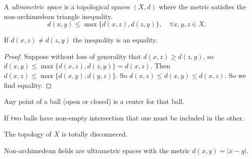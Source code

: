 \begin{definition}
	A \emph{ultrametric space} is a topological spaces $(X, d)$ where the metric satisfies the non-archimedean triangle inequality. 
	\[
		d(x, y) \le \max \{d(x, z) ,d(z, y)\}, \quad \forall x, y ,z \in X
	.\] 
\end{definition}
\begin{exercise}
	If $d(x,z) \ne d(z,y)$ the inequality is an equality. 
\end{exercise}
\begin{proof}
	Suppose without loss of generality that $d(x, z) \ge d(z,y)$, so $d(x, y) \le \max \{d(x, z), d(z,y)\} = d(x, z) $. 
	Then $d(x, z) \le \max \{d(x, y), d(y,z)\}$. So $d(x, z) \le d(x, y) \le d(x, z)$. So we find equality.
\end{proof}
\begin{corollary}
	Any point of a ball (open or closed) is a center for that ball. 
\end{corollary}
\begin{corollary}
	If two balls have non-empty intersection that one must be included in the other. 
\end{corollary}
\begin{corollary}
	The topology of $X$ is totally disconneced. 
\end{corollary}

Non-archimedean fields are ultrametric spaces with the metric $d(x, y) = |x - y|$. 

